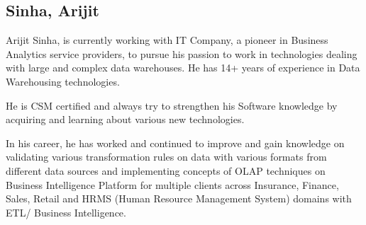 \subsection{Sinha, Arijit}

Arijit Sinha, is currently working with IT Company, a pioneer in
Business Analytics service providers, to pursue his passion to work in
technologies dealing with large and complex data warehouses. He has
14+ years of experience in Data Warehousing technologies.

He is CSM certified and always try to strengthen his Software
knowledge by acquiring and learning about various new technologies.

In his career, he has worked and continued to improve and gain
knowledge on validating various transformation rules on data with
various formats from different data sources and implementing concepts
of OLAP techniques on Business Intelligence Platform for multiple
clients across Insurance, Finance, Sales, Retail and HRMS (Human
Resource Management System) domains with ETL/ Business Intelligence.
